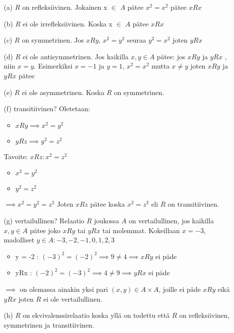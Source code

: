 \documentclass{article}
\begin{document}
    \begin{enumerate}
        \item[(a)] $R$ on refleksiivinen. Jokainen x \(\in\) \(A\) pätee \(x^2 = x^2\) pätee \(xRx\)
        \item[(b)] $R$ ei ole irrefleksiivinen. Koska x \(\in\) \(A\) pätee \(xRx\)
        \item[(c)] $R$ on symmetrinen. Jos \(xRy\), \(x^2 = y^2\) seuraa \(y^2 = x^2\) joten \(yRx\)
        \item[(d)] $R$ ei ole antisymmetrinen. Jos kaikilla \(x, y \in A\) pätee: jos  \(xRy\)  ja  \(yRx\) , niin  \(x = y\).
        Esimerkiksi  \(x = -1\)  ja  \(y = 1\), \(x^2 = x^2\) mutta \(x \neq y\) joten \(xRy\)  ja  \(yRx\) pätee
        \item[(e)] $R$ ei ole asymmetrinen. Koska \(R\) on symmetrinen.
        \item[(f)] transitiivinen?\newline
            Oletetaan:
            \begin{itemize}
                \item $xRy \implies x^2 = y^2$
                \item $yRz \implies y^2 = z^2$
            \end{itemize}
            Tavoite: \(xRz: x^2 = z^2\)
            \begin{itemize}
                \item $x^2 = y^2$
                \item $y^2 = z^2$
            \end{itemize}
            $\implies x^2 = y^2 = z^2$ \newline
            Joten $xRz$ pätee koska $x^2 = z^2$ eli $R$ on transitiivinen.
        \item[(g)] vertailullinen?\newline
        Relaatio  $R$  joukossa  $A$  on vertailullinen, jos kaikilla  $x, y \in A$  pätee joko  $xRy$  tai  $yRx$  tai molemmat.\newline
        Kokeillaan $x = -3$, madolliset  $y \in A :  -3, -2, -1, 0, 1, 2, 3$
        \begin{itemize}
            \item y = -2 : \( (-3)^2 = (-2)^2 \implies 9 \neq 4 \implies xRy \) ei päde
            \item yRx : \( (-2)^2 = (-3)^2 \implies 4 \neq 9 \implies yRx \) ei päde
        \end{itemize}
        $\implies$ on olemassa ainakin yksi pari  $(x, y) \in A \times A $, joille ei päde  $xRy$  eikä  $yRx$ joten $R$ ei ole vertailullinen.
        \item[(h)] $R$ on ekvivalenssirelaatio koska yllä on todettu että $R$ on refleksiivinen, symmetrinen ja transitiivinen.
    \end{enumerate}	
    
\end{document}
